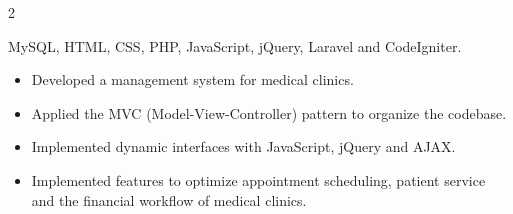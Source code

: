 \documentclass[10pt]{article}
\begin{document}
\begin{paracol}{2}
{\footnotesize\color{textgray}MySQL, HTML, CSS, PHP, JavaScript, jQuery, Laravel and CodeIgniter.\par\vspace{2pt}}
\begin{itemize}
  \item Developed a management system for medical clinics.
  \item Applied the MVC (Model-View-Controller) pattern to organize the codebase.
  \item Implemented dynamic interfaces with JavaScript, jQuery and AJAX.
  \item Implemented features to optimize appointment scheduling, patient service and the financial workflow of medical clinics.
\end{itemize}

\end{paracol}
\end{document}
